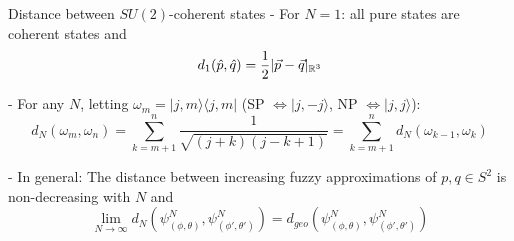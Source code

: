 \begin{frame}{Distance between $SU(2)$-coherent states} %
- For $N = 1$: all pure states are coherent states and 
\begin{equation}
    d_1(\hat p, \hat q) = \frac{1}{2}|\vec p - \vec q|_{\mathbb R^3}
\end{equation}

- For any $N$, letting $\omega_m = |j, m\rangle \langle j, m|$ (SP $\Longleftrightarrow |j, -j\rangle$, NP $\Longleftrightarrow |j, j\rangle$):
\begin{equation}
    d_N(\omega_m, \omega_n) = \sum_{k = m+1}^n \frac{1}{\sqrt{(j+k)(j-k+1)}} = \sum_{k = m+1}^n d_N(\omega_{k-1}, \omega_k)
\end{equation}

- In general:
    The distance between increasing fuzzy approximations of $p, q \in S^2$ is non-decreasing with $N$ and
    \begin{equation}
        \lim_{N \to \infty} d_N(\psi^N_{(\phi, \theta)}, \psi^N_{(\phi', \theta')}) = d_{geo}(\psi^N_{(\phi, \theta)}, \psi^N_{(\phi', \theta')})
    \end{equation}
\end{frame}








